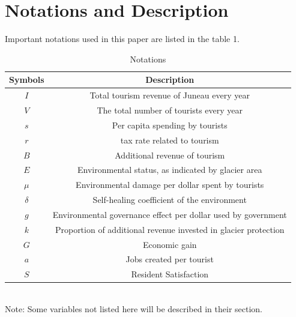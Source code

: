 \documentclass[UTF8]{mcmthesis}
\begin{document}
    \section{Notations and Description}
        \hspace*{2em}Important notations used in this paper are listed in the table 1.
        \vspace{-.5em}
        \begin{table}[htbp]
            \centering
            \caption{Notations}
            \vspace{0.5em}
            \begin{tabular}{cc}
                \toprule                %
                    \textbf{Symbols} & \textbf{Description} \\ 
                \midrule                %
                $I$        & Total tourism revenue of Juneau every year \\ 
                $V$        & The total number of tourists every year \\ 
                $s$        & Per capita spending by tourists \\ 
                $r$        & tax rate related to tourism \\  
                $B$        & Additional revenue of tourism \\ 
                $E$        & Environmental status, as indicated by glacier area \\ 
                $\mu$      & Environmental damage per dollar spent by tourists \\ 
                $\delta$   & Self-healing coefficient of the environment  \\ 
                $g$        & Environmental governance effect per dollar used by government \\ 
                $k$        & Proportion of additional revenue invested in glacier protection \\ 
                $G$        & Economic gain \\ 
                $a$        & Jobs created per tourist \\ 
                $S$        & Resident Satisfaction \\  
                \bottomrule             %
            \end{tabular}

        \end{table} \\
        \hspace*{2em} Note: Some variables not listed here will be described in their section.
\end{document}

